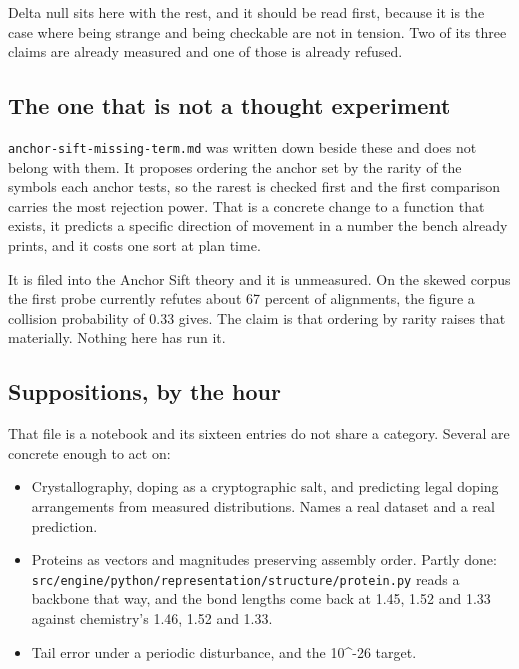 Delta null sits here with the rest, and it should be read first, because it is the case where being strange and being checkable are not in tension. Two of its three claims are already measured and one of those is already refused.

\subsection{The one that is not a thought experiment}

\texttt{anchor-\allowbreak{}sift-\allowbreak{}missing-\allowbreak{}term.\allowbreak{}md} was written down beside these and does not belong with them. It proposes ordering the anchor set by the rarity of the symbols each anchor tests, so the rarest is checked first and the first comparison carries the most rejection power. That is a concrete change to a function that exists, it predicts a specific direction of movement in a number the bench already prints, and it costs one sort at plan time.

It is filed into the Anchor Sift theory and it is unmeasured. On the skewed corpus the first probe currently refutes about 67 percent of alignments, the figure a collision probability of 0.33 gives. The claim is that ordering by rarity raises that materially. Nothing here has run it.

\subsection{Suppositions, by the hour}

That file is a notebook and its sixteen entries do not share a category. Several are concrete enough to act on:

\begin{itemize}
\item Crystallography, doping as a cryptographic salt, and predicting legal doping arrangements from measured distributions. Names a real dataset and a real prediction.
\item Proteins as vectors and magnitudes preserving assembly order. Partly done: \texttt{src/\allowbreak{}engine/\allowbreak{}python/\allowbreak{}representation/\allowbreak{}structure/\allowbreak{}protein.\allowbreak{}py} reads a backbone that way, and the bond lengths come back at 1.45, 1.52 and 1.33 against chemistry's 1.46, 1.52 and 1.33.
\item Tail error under a periodic disturbance, and the 10\textasciicircum{}-26 target.
\end{itemize}

